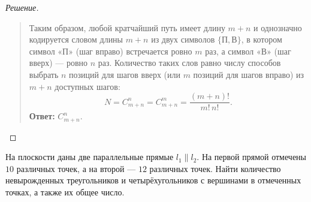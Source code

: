 \begin{proof}[Решение]
\begin{quote}
        Таким образом, любой кратчайший путь имеет длину $m + n$ и 
        однозначно кодируется словом длины $m + n$ из двух символов 
        $\{\text{П}, \text{В}\}$, в котором символ «П» (шаг вправо) 
        встречается ровно $m$ раз, а символ «В» (шаг вверх) --- ровно $n$ 
        раз. Количество таких слов равно числу способов выбрать $n$ позиций 
        для шагов вверх (или $m$ позиций для шагов вправо) из $m + n$ 
        доступных шагов:
        \begin{equation} \label{eq:grid_paths}
            N = C_{m+n}^n = C_{m+n}^m = \frac{(m + n)!}{m! \, n!}. \tag{2}
        \end{equation}
        \textbf{Ответ:} $C_{m+n}^n$.
    \end{quote}
\end{proof}

\begin{problem}
    На плоскости даны две параллельные прямые $l_1 \parallel l_2$. На 
    первой прямой отмечены $10$ различных точек, а на второй --- $12$ 
    различных точек. Найти количество невырожденных треугольников и 
    четырёхугольников с вершинами в отмеченных точках, а также их общее 
    число.
\end{problem}

